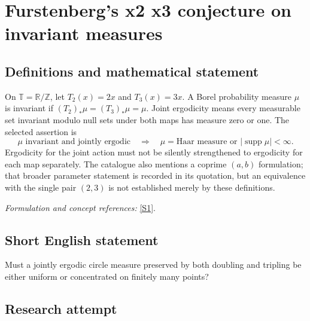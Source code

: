 \documentclass[11pt,a4paper]{article}
\newcommand{\Z}{\mathbb{Z}}
\newcommand{\R}{\mathbb{R}}
\newcommand{\sref}[2]{\hyperlink{source:#1:#2}{[S#2]}}
\newif\ifshowcatalogue
\newcommand{\cataloguescope}[1]{\ifshowcatalogue
 \paragraph{Exact scope in the supplied catalogue.}
 \begin{quote}\small #1\end{quote}\fi}
\numberwithin{equation}{section}
\begin{document}
\setcounter{section}{182}
\clearpage
\section{\texorpdfstring{Furstenberg's x2 x3 conjecture on invariant measures}{Furstenberg's x2 x3 conjecture on invariant measures}}\label{183}
\subsection{Definitions and mathematical statement}
On $\mathbb T=\R/\Z$, let $T_2(x)=2x$ and $T_3(x)=3x$. A Borel probability measure $\mu$ is invariant if $(T_2)_*\mu=(T_3)_*\mu=\mu$. Joint ergodicity means every measurable set invariant modulo null sets under both maps has measure zero or one. The selected assertion is
\[
 \mu\text{ invariant and jointly ergodic}
 \quad\Longrightarrow\quad
 \mu=\text{Haar measure or }|\operatorname{supp}\mu|<\infty.
\]
Ergodicity for the joint action must not be silently strengthened to ergodicity for each map separately. The catalogue also mentions a coprime $(a,b)$ formulation; that broader parameter statement is recorded in its quotation, but an equivalence with the single pair $(2,3)$ is not established merely by these definitions.
\par\smallskip\textit{Formulation and concept references:} \sref{183}{1}.
\cataloguescope{Prove that every ergodic probability measure on the unit circle T that is invariant under both maps x -> 2x mod 1 and x -> 3x mod 1 is either the Lebesgue measure or supported on a finite set (equivalently, for coprime a,b >= 2, every ergodic x(a,b)-invariant measure is Lebesgue or finitely supported).}
\subsection{Short English statement}
Must a jointly ergodic circle measure preserved by both doubling and tripling be either uniform or concentrated on finitely many points?
\subsection{Research attempt}
\end{document}
